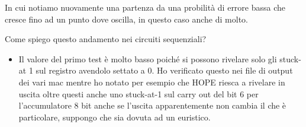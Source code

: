\documentclass[12pt, letterpaper]{article}
\begin{document}
In cui notiamo nuovamente una partenza da una probilità di errore bassa che cresce fino ad un punto dove oscilla, in questo caso anche di molto.

Come spiego questo andamento nei circuiti sequenziali?

\begin{itemize}
\item Il valore del primo test è molto basso poiché si possono rivelare solo gli stuck-at 1 sul registro avendolo settato a 0. Ho verificato questo nei file di output dei vari mac mentre ho notato per esempio che HOPE riesca a rivelare in uscita oltre questi anche uno stuck-at-1 sul carry out del bit 6 per l'accumulatore 8 bit anche se l'uscita apparentemente non cambia il che è particolare, suppongo che sia dovuta ad un euristico.

\end{itemize}
\end{document}
